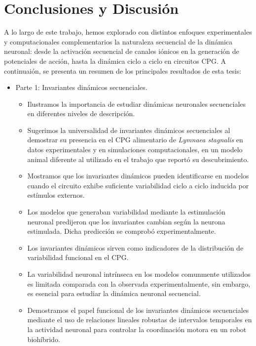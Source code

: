 \chapter{Conclusiones y Discusión} %

A lo largo de este trabajo, hemos explorado con distintos enfoques experimentales y computacionales complementarios la naturaleza secuencial de la dinámica neuronal: desde la activación secuencial de canales iónicos en la generación de potenciales de acción, hasta la dinámica ciclo a ciclo en circuitos CPG. A continuaión, se presenta un resumen de los principales resultados de esta tesis:

\begin{itemize}
	\item Parte 1: Invariantes dinámicos secuenciales.
	\begin{itemize}
		\item Ilustramos la importancia de estudiar dinámicas neuronales secuenciales en diferentes niveles de descripción.
		\item Sugerimos la universalidad de invariantes dinámicos secuenciales al demostrar su presencia en el CPG alimentario de \textit{Lymnaea stagnalis} en datos experimentales y en simulaciones computacionales, en un modelo animal diferente al utilizado en el trabajo que reportó su descubrimiento.
		\item Mostramos que los invariantes dinámicos pueden identificarse en modelos cuando el circuito exhibe suficiente variabilidad ciclo a ciclo inducida por estímulos externos.
		\item Los modelos que generaban variabilidad mediante la estimulación neuronal predijeron que los invariantes cambian según la neurona estimulada. Dicha predicción se comprobó experimentalmente.
		\item Los invariantes dinámicos sirven como indicadores de la distribución de variabilidad funcional en el CPG.
		\item La variabilidad neuronal intrínseca en los modelos comunmente utilizados es limitada comparada con la observada experimentalmente, sin embargo, es esencial para estudiar la dinámica neuronal secuencial.
		\item Demostramos el papel funcional de los invariantes dinámicos secuenciales mediante el uso de relaciones lineales robustas de intervalos temporales en la actividad neuronal para controlar la coordinación motora en un robot biohíbrido.
	\end{itemize}
	

\end{itemize}
